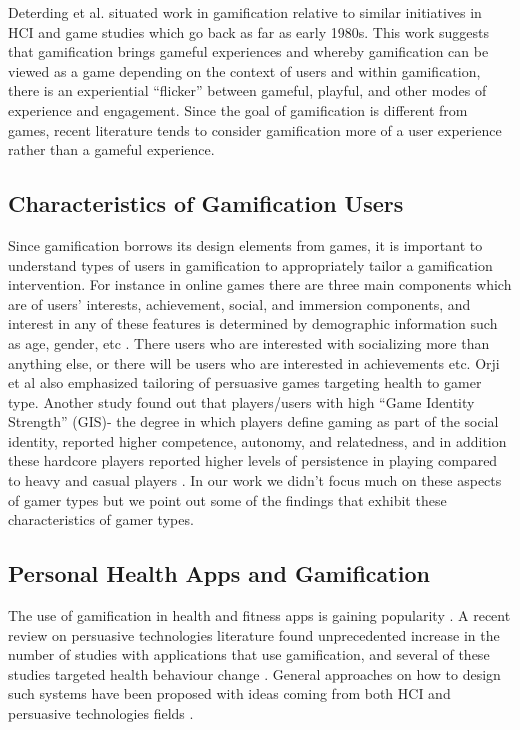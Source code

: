 \documentclass{sig-alternate}
\begin{document}
Deterding et al. \cite{deterding2011game} situated work in gamification relative to similar initiatives in HCI and game studies which go back as far as early 1980s. This work suggests that gamification brings gameful experiences and whereby gamification can be viewed as a game depending on the context of users and within gamification, there is an experiential ``flicker'' between gameful, playful, and other modes of experience and engagement. Since the goal of gamification is different from games, recent literature  tends to consider gamification more of a user experience rather than a gameful experience\cite{seaborn2015:gamification}.
\subsection{Characteristics of Gamification Users}
Since gamification borrows its design elements from games, it is important to understand types of users in gamification to appropriately tailor a gamification intervention. For instance in online games there are three main components which are of users' interests, achievement, social, and immersion components, and interest in any of these features is determined by demographic information such as age, gender, etc \cite{yee2006:motivations}. There users who are interested with socializing more than anything else, or there will be users who are interested in achievements etc. Orji et al also \cite{orji2013:tailoring} emphasized tailoring of persuasive games targeting health to gamer type. Another study found out that players/users with high ``Game Identity Strength'' (GIS)- the degree in which players define gaming as part of the social identity, reported higher competence, autonomy, and relatedness, and in addition these hardcore players reported higher levels of persistence in playing compared to heavy and casual players \cite{neys2014:exploring}. In our work we didn't focus much on these aspects of gamer types but we point out some of the findings that exhibit these characteristics of gamer types. 
\subsection{Personal Health Apps and Gamification}  
The use of gamification in health and fitness apps is gaining popularity \cite{lister2014:just}. A recent review on persuasive technologies literature found unprecedented increase in the number of studies with applications that use gamification, and several of these studies targeted health behaviour change \cite{hamari2014persuasive}. General approaches on how to design such systems have been proposed with ideas coming from both HCI\cite{li2010:stage} and persuasive technologies fields \cite{fogg2009:behavior,Oinas-kukkonen:psd,Oinas-Kukkonen:foundation}.
\end{document}
